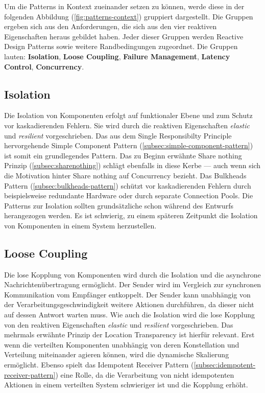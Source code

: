Um die Patterns in Kontext zueinander setzen zu können, werde diese in der folgenden Abbildung (\ref{fig:patterns-context}) gruppiert dargestellt. Die Gruppen ergeben sich aus den Anforderungen, die sich aus den vier reaktiven Eigenschaften heraus gebildet haben. Jeder dieser Gruppen werden Reactive Design Patterns sowie weitere Randbedingungen zugeordnet. Die Gruppen lauten: \textbf{Isolation}, \textbf{Loose Coupling}, \textbf{Failure Management}, \textbf{Latency Control}, \textbf{Concurrency}.

\subsection{Isolation}
Die Isolation von Komponenten erfolgt auf funktionaler Ebene und zum Schutz vor kaskadierenden Fehlern. Sie wird durch die reaktiven Eigenschaften \textit{elastic} und \textit{resilient} vorgeschrieben. Das aus dem Single Responsibilty Principle hervorgehende Simple Component Pattern (\ref{subsec:simple-component-pattern}) ist somit ein grundlegendes Pattern. Das zu Beginn erwähnte Share nothing Prinzip (\ref{subsec:sharenothing}) schlägt ebenfalls in diese Kerbe --- auch wenn sich die Motivation hinter Share nothing auf Concurrency bezieht. Das Bulkheads Pattern (\ref{subsec:bulkheads-pattern}) schützt vor kaskadierenden Fehlern durch beispielsweise redundante Hardware oder durch separate Connection Pools. Die Patterns zur Isolation sollten grundsätzliche schon während des Entwurfs herangezogen werden. Es ist schwierig, zu einem späteren Zeitpunkt die Isolation von Komponenten in einem System herzustellen.

\subsection{Loose Coupling}
Die lose Kopplung von Komponenten wird durch die Isolation und die asynchrone Nachrichtenübertragung ermöglicht. Der Sender wird im Vergleich zur synchronen Kommunikation vom Empfänger entkoppelt. Der Sender kann unabhängig von der Verarbeitungsgeschwindigkeit weitere Aktionen durchführen, da dieser nicht auf dessen Antwort warten muss. Wie auch die Isolation wird die lose Kopplung von den reaktiven Eigenschaften \textit{elastic} und \textit{resilient} vorgeschrieben. Das mehrmals erwähnte Prinzip der Location Transparency ist hierfür relevant. Erst wenn die verteilten Komponenten unabhängig von deren Konstellation und Verteilung miteinander agieren können, wird die dynamische Skalierung ermöglicht. Ebenso spielt das Idempotent Receiver Pattern (\ref{subsec:idempotent-receiver-pattern}) eine Rolle, da die Verarbeitung von nicht idempotenten Aktionen in einem verteilten System schwieriger ist und die Kopplung erhöht.

